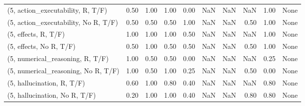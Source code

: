 \begin{table*}[h!]
\begin{adjustbox}{width=2\columnwidth,center}
\begin{tabular}{lrrr|rrr|rrr}
(5, action\_executability, R, T/F)    &                      0.50 &                  1.00 &                      1.00 &                          0.00 &                       NaN &                           NaN &                                    NaN &                               1.00 &                                  None \\
(5, action\_executability, No R, T/F) &                      0.50 &                  0.50 &                      0.50 &                          1.00 &                       NaN &                           NaN &                                   0.50 &                               1.00 &                                  None \\
(5, effects, R, T/F)                 &                      1.00 &                  1.00 &                      1.00 &                          0.50 &                       NaN &                           NaN &                                    NaN &                               1.00 &                                  None \\
(5, effects, No R, T/F)              &                      0.50 &                  1.00 &                      0.50 &                          0.50 &                       NaN &                           NaN &                                   0.50 &                               1.00 &                                  None \\
(5, numerical\_reasoning, R, T/F)     &                      1.00 &                  0.50 &                      0.50 &                          0.00 &                       NaN &                           NaN &                                    NaN &                               0.25 &                                  None \\
(5, numerical\_reasoning, No R, T/F)  &                      1.00 &                  0.50 &                      1.00 &                          0.25 &                       NaN &                           NaN &                                   0.50 &                               0.00 &                                  None \\
(5, hallucination, R, T/F)           &                      0.60 &                  1.00 &                      0.80 &                          0.40 &                       NaN &                           NaN &                                    NaN &                               0.80 &                                  None \\
(5, hallucination, No R, T/F)        &                      0.20 &                  1.00 &                      1.00 &                          0.40 &                       NaN &                           NaN &                                   0.80 &                               0.80 &                                  None \\

\end{tabular}
\end{adjustbox}
\end{table*}
